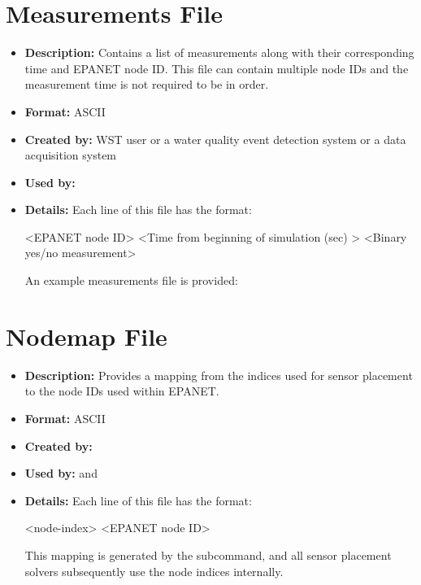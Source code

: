\section{Measurements File}\label{formats_measFile}
\begin{itemize}
\item {\bfseries Description:} Contains a list of measurements along with their corresponding time and EPANET node ID.
  This file can contain multiple node IDs and the measurement time is not required to be in order. 
\item {\bfseries Format:} ASCII
\item {\bfseries Created by:} WST user or a water quality event detection system or a data acquisition system  
\item {\bfseries Used by:}  
\item {\bfseries Details:} Each line of this file has the format:
\begin{unknownListing}
   <EPANET node ID> <Time from beginning of simulation (sec) > <Binary yes/no measurement>
\end{unknownListing}
An example measurements file is provided:
\end{itemize}

\section{Nodemap File}\label{formats_nodeFile}
\begin{itemize}
\item {\bfseries Description:} Provides a mapping from the indices used for sensor placement to the node IDs used within EPANET.
\item {\bfseries Format:} ASCII 
\item {\bfseries Created by:}  
\item {\bfseries Used by:}  and  
\item {\bfseries Details:} Each line of this file has the format:
\begin{unknownListing}
   <node-index> <EPANET node ID>
\end{unknownListing}
This mapping is generated by the  subcommand, and all sensor placement solvers subsequently use the node indices internally. 
\end{itemize}


